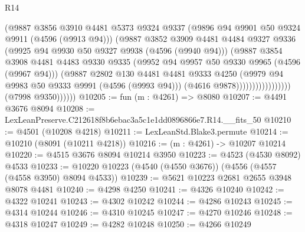 \begin{lexlean}{R14}
\begin{coremodule}
                                      (@9887
                                        @3856
                                        @3910
                                        @4481
                                        @5373
                                        @9324
                                        @9337
                                        (@9896 @94 @9901 @50 @9324 @9911 (@4596 (@9913 @94)))
                                        (@9887
                                          @3852
                                          @3909
                                          @4481
                                          @4484
                                          @9327
                                          @9336
                                          (@9925 @94 @9930 @50 @9327 @9938 (@4596 (@9940 @94)))
                                          (@9887
                                            @3854
                                            @3908
                                            @4481
                                            @4483
                                            @9330
                                            @9335
                                            (@9952 @94 @9957 @50 @9330 @9965 (@4596 (@9967 @94)))
                                            (@9887
                                              @2802
                                              @130
                                              @4481
                                              @4481
                                              @9333
                                              @4250
                                              (@9979 @94 @9983 @50 @9333 @9991 (@4596 (@9993 @94)))
                                              (@4616 @9878)))))))))))))))))
              (@7998 @9350))))))
@10205 := fun (m : @4261) => @8080
@10207 := @4491 @3676 @8094
@10208 := LexLeanPreserve.C212618f8b6ebac3a5c1e1dd0896866e7.R14.__fits_50
@10210 := @4501 (@10208 @4218)
@10211 := LexLeanStd.Blake3.permute
@10214 := @10210 (@8091 (@10211 @4218))
@10216 := (m : @4261) -> @10207 @10214
@10220 := @4515 @3676 @8094 @10214 @3950
@10223 := @4523 (@4530 @8092) @4533
@10233 := @10220 @10223 (@4540 (@4550 @3676)) (@4556 (@4557 (@4558 @3950) @8094 @4533))
@10239 := @5621 @10223 @2681 @2655 @3948 @8078 @4481
@10240 := @4298 @4250
@10241 := @4326 @10240
@10242 := @4322 @10241
@10243 := @4302 @10242
@10244 := @4286 @10243
@10245 := @4314 @10244
@10246 := @4310 @10245
@10247 := @4270 @10246
@10248 := @4318 @10247
@10249 := @4282 @10248
@10250 := @4266 @10249

\end{coremodule}
\end{lexlean}
